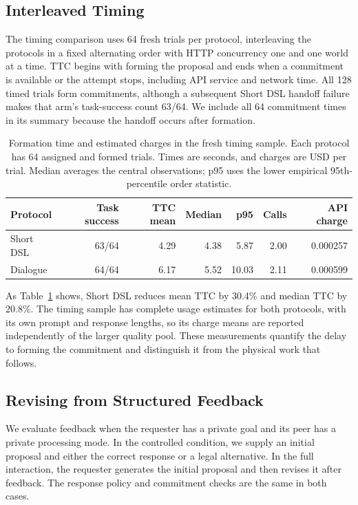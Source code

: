 \documentclass[sigconf,nonacm,balance=false]{aamas}
\newcommand{\tabstyle}{\small\setlength{\tabcolsep}{3pt}\renewcommand{\arraystretch}{1.10}}
\begin{document}
\subsection{Interleaved Timing}
The timing comparison uses 64 fresh trials per protocol, interleaving the protocols in a fixed alternating order with HTTP concurrency one and one world at a time. TTC begins with forming the proposal and ends when a commitment is available or the attempt stops, including API service and network time. All 128 timed trials form commitments, although a subsequent Short DSL handoff failure makes that arm's task-success count 63/64. We include all 64 commitment times in its summary because the handoff occurs after formation.

\begin{table}[!htbp]
\centering\tabstyle
\caption{Formation time and estimated charges in the fresh timing sample. Each protocol has 64 assigned and formed trials. Times are seconds, and charges are USD per trial. Median averages the central observations; p95 uses the lower empirical 95th-percentile order statistic.}
\label{tab:prompted-timing-complete}
\begin{tabular}{@{}lrrrrrr@{}}\toprule
Protocol & Task success & TTC mean & Median & p95 & Calls & API charge\\\midrule
Short DSL & 63/64 & 4.29 & 4.38 & 5.87 & 2.00 & 0.000257\\
Dialogue & 64/64 & 6.17 & 5.52 & 10.03 & 2.11 & 0.000599\\\bottomrule
\end{tabular}
\end{table}

As Table~\ref{tab:prompted-timing-complete} shows, Short DSL reduces mean TTC by 30.4\% and median TTC by 20.8\%. The timing sample has complete usage estimates for both protocols, with its own prompt and response lengths, so its charge means are reported independently of the larger quality pool. These measurements quantify the delay to forming the commitment and distinguish it from the physical work that follows.

\subsection{Revising from Structured Feedback}
We evaluate feedback when the requester has a private goal and its peer has a private processing mode. In the controlled condition, we supply an initial proposal and either the correct response or a legal alternative. In the full interaction, the requester generates the initial proposal and then revises it after feedback. The response policy and commitment checks are the same in both cases.
\end{document}
